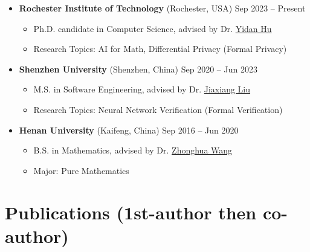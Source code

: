 \documentclass[a4paper,11pt]{article}
\begin{document}
\begin{itemize}[leftmargin=0pt,label={}]
    \item \textbf{Rochester Institute of Technology}{ \scriptsize (Rochester, USA)} \hfill Sep 2023 -- Present\vspace{-0.5em}    
    \begin{itemize}
      \item Ph.D. candidate in Computer Science, advised by Dr. \href{https://yidanhu.csec.rit.edu/}{Yidan Hu}
      \item Research Topics: AI for Math, Differential Privacy (Formal Privacy)
    \end{itemize}
    \item \textbf{Shenzhen University}{ \scriptsize (Shenzhen, China)} \hfill Sep 2020 -- Jun 2023\vspace{-0.5em}
    \begin{itemize}
      \item M.S. in Software Engineering, advised by Dr. \href{https://csse.szu.edu.cn/pages/user/index?id=1031}{Jiaxiang Liu}
      \item Research Topics: Neural Network Verification (Formal Verification)
    \end{itemize}
    \item \textbf{Henan University}{ \scriptsize (Kaifeng, China)} \hfill Sep 2016 -- Jun 2020\vspace{-0.5em}
    \begin{itemize}
      \item B.S. in Mathematics, advised by Dr. \href{https://maths.henu.edu.cn/info/1204/3593.htm}{Zhonghua Wang}
      \item Major: Pure Mathematics
    \end{itemize}
\end{itemize}


\section{\textbf{Publications} \textnormal{\scriptsize (1st-author then co-author)}}
\end{document}
